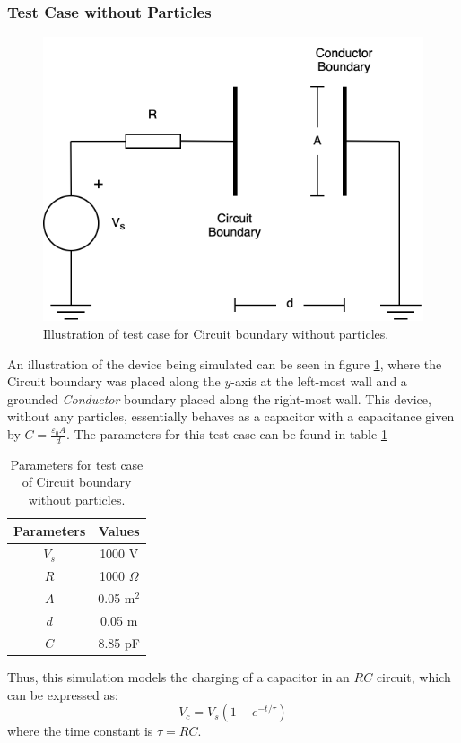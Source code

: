 \subsubsection{Test Case without Particles}

\begin{figure}[h!]
	\centering
	\includegraphics[width=0.59\linewidth]{xoopic/figures/circuit_test.png}
	\caption{Illustration of test case for Circuit boundary without particles.}
	\label{fig:circuit_test}
\end{figure} 

An illustration of the device being simulated can be seen in figure \ref{fig:circuit_test}, where the Circuit boundary was placed along the $y$-axis at the left-most wall and a grounded \textit{Conductor} boundary placed along the right-most wall. This device, without any particles, essentially behaves as a capacitor with a capacitance given by $C = \frac{\varepsilon_0 A}{d}$. The parameters for this test case can be found in table \ref{tb:test_1}

\begin{table}[h!]
	\caption{Parameters for test case of Circuit boundary without particles.}
	\vspace{5 pt}
	\centering
	\begin{tabular}{c c}
		Parameters  & Values 	    \\
		\hline 
		$V_s$       & 1000 V        \\
		$R$         & 1000 $\Omega$ \\
		$A$         & 0.05 m$^2$    \\
		$d$         & 0.05 m	    \\
		$C$			& 8.85 pF
	\end{tabular}
	\label{tb:test_1}
\end{table}

Thus, this simulation models the charging of a capacitor in an $RC$ circuit, which can be expressed as:
\begin{equation}
	V_c = V_s(1 - e^{-t/\tau})
	\label{eq:rc_circuit}
\end{equation}
where the time constant is $\tau = RC$. 

